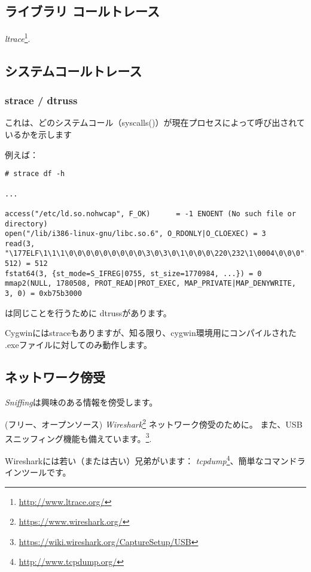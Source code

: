 \subsection{ライブラリ コールトレース}

\emph{ltrace}\footnote{\url{http://www.ltrace.org/}}.

\subsection{システムコールトレース}

\label{strace}
\subsubsection{strace / dtruss}

これは、どのシステムコール（syscalls()）が現在プロセスによって呼び出されているかを示します

例えば：

\begin{lstlisting}
# strace df -h

...

access("/etc/ld.so.nohwcap", F_OK)      = -1 ENOENT (No such file or directory)
open("/lib/i386-linux-gnu/libc.so.6", O_RDONLY|O_CLOEXEC) = 3
read(3, "\177ELF\1\1\1\0\0\0\0\0\0\0\0\0\3\0\3\0\1\0\0\0\220\232\1\0004\0\0\0"..., 512) = 512
fstat64(3, {st_mode=S_IFREG|0755, st_size=1770984, ...}) = 0
mmap2(NULL, 1780508, PROT_READ|PROT_EXEC, MAP_PRIVATE|MAP_DENYWRITE, 3, 0) = 0xb75b3000
\end{lstlisting}

\myindex{\MacOSX}
\MacOSX は同じことを行うために dtrussがあります。

Cygwinにはstraceもありますが、知る限り、cygwin環境用にコンパイルされた
.exeファイルに対してのみ動作します。

\subsection{ネットワーク傍受}

\emph{Sniffing}は興味のある情報を傍受します。

(フリー、オープンソース) \emph{Wireshark}\footnote{\url{https://www.wireshark.org/}} ネットワーク傍受のために。
また、USBスニッフィング機能も備えています。\footnote{\url{https://wiki.wireshark.org/CaptureSetup/USB}}.

Wiresharkには若い（または古い）兄弟がいます： \emph{tcpdump}\footnote{\url{http://www.tcpdump.org/}}、簡単なコマンドラインツールです。

